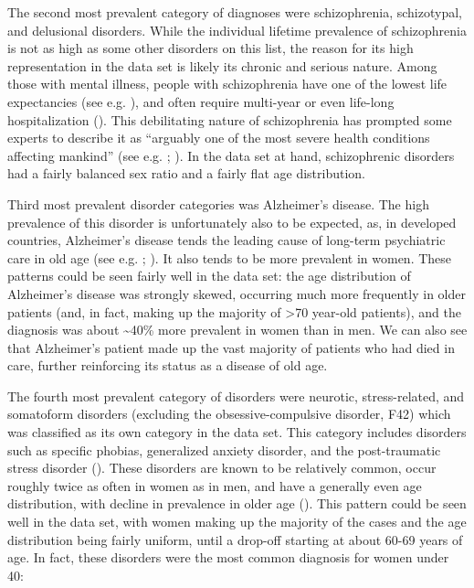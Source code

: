 \documentclass[
]{book}
\theoremstyle{definition}
\theoremstyle{definition}
\theoremstyle{definition}
\theoremstyle{definition}
\theoremstyle{remark}
\begin{document}
The second most prevalent category of diagnoses were schizophrenia, schizotypal, and delusional disorders. While the individual lifetime prevalence of schizophrenia is not as high as some other disorders on this list, the reason for its high representation in the data set is likely its chronic and serious nature. Among those with mental illness, people with schizophrenia have one of the lowest life expectancies (see e.g. ), and often require multi-year or even life-long hospitalization (). This debilitating nature of schizophrenia has prompted some experts to describe it as ``arguably one of the most severe health conditions affecting mankind'' (see e.g. ; ). In the data set at hand, schizophrenic disorders had a fairly balanced sex ratio and a fairly flat age distribution.

Third most prevalent disorder categories was Alzheimer's disease. The high prevalence of this disorder is unfortunately also to be expected, as, in developed countries, Alzheimer's disease tends the leading cause of long-term psychiatric care in old age (see e.g. ; ). It also tends to be more prevalent in women. These patterns could be seen fairly well in the data set: the age distribution of Alzheimer's disease was strongly skewed, occurring much more frequently in older patients (and, in fact, making up the majority of \textgreater70 year-old patients), and the diagnosis was about \textasciitilde40\% more prevalent in women than in men. We can also see that Alzheimer's patient made up the vast majority of patients who had died in care, further reinforcing its status as a disease of old age.

The fourth most prevalent category of disorders were neurotic, stress-related, and somatoform disorders (excluding the obsessive-compulsive disorder, F42) which was classified as its own category in the data set. This category includes disorders such as specific phobias, generalized anxiety disorder, and the post-traumatic stress disorder (). These disorders are known to be relatively common, occur roughly twice as often in women as in men, and have a generally even age distribution, with decline in prevalence in older age (). This pattern could be seen well in the data set, with women making up the majority of the cases and the age distribution being fairly uniform, until a drop-off starting at about 60-69 years of age. In fact, these disorders were the most common diagnosis for women under 40:
\end{document}
